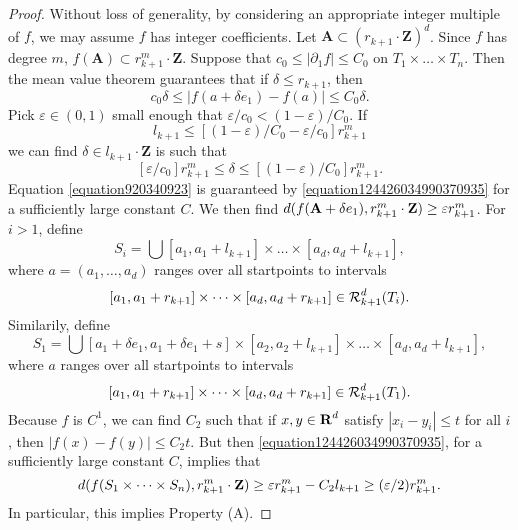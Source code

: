 \begin{proof}
    Without loss of generality, by considering an appropriate integer multiple of $f$, we may assume $f$ has integer coefficients. Let $\mathbf{A} \subset (r_{k+1} \cdot \mathbf{Z})^d$. Since $f$ has degree $m$, $f(\mathbf{A}) \subset r_{k+1}^m \cdot \mathbf{Z}$. Suppose that $c_0 \leq |\partial_1 f| \leq C_0$ on $T_1 \times \dots \times T_n$. Then the mean value theorem guarantees that if $\delta \leq r_{k+1}$, then
    \[ c_0 \delta \leq |f(a + \delta e_1) - f(a)| \leq C_0 \delta. \]
    Pick $\varepsilon \in (0,1)$ small enough that $\varepsilon/c_0 < (1 - \varepsilon)/C_0$. If
    \begin{equation} \label{equation920340923}
        l_{k+1} \leq [(1-\varepsilon)/C_0 - \varepsilon/c_0] r_{k+1}^m
    \end{equation}
    we can find $\delta \in l_{k+1} \cdot \mathbf{Z}$ is such that
    \[ [\varepsilon/c_0] r_{k+1}^m \leq \delta \leq [(1 - \varepsilon)/C_0] r_{k+1}^m. \]
    Equation \eqref{equation920340923} is guaranteed by \eqref{equation124426034990370935} for a sufficiently large constant $C$. We then find $d(f(\mathbf{A} + \delta e_1), r_{k+1}^m \cdot \operatorname{\mathbf{Z}}) \geq \varepsilon r_{k+1}^m$. For $i > 1$, define
    \[ S_i = \bigcup [a_1, a_1 + l_{k+1}] \times \dots \times [a_d, a_d + l_{k+1}], \]
    where $a = (a_1, \dots, a_d)$ ranges over all startpoints to intervals
    \[ [a_1,a_1 + r_{k+1}] \times \dots \times [a_d,a_d + r_{k+1}] \in \operatorname{\mathcal{R}}_{k+1}^d(T_i). \]
    Similarily, define
    \[ S_1 = \bigcup [a_1 + \delta e_1, a_1 + \delta e_1 + s] \times [a_2, a_2 + l_{k+1}] \times \dots \times [a_d, a_d + l_{k+1}], \]
    where $a$ ranges over all startpoints to intervals
    \[ [a_1,a_1 + r_{k+1}] \times \dots \times [a_d,a_d + r_{k+1}] \in \operatorname{\mathcal{R}}_{k+1}^d(T_1). \]
    Because $f$ is $C^1$, we can find $C_2$ such that if $x, y \in \operatorname{\mathbf{R}}^d$ satisfy $|x_i - y_i| \leq t$ for all $i$, then $|f(x) - f(y)| \leq C_2 t$. But then \eqref{equation124426034990370935}, for a sufficiently large constant $C$, implies that
    \[ d(f(S_1 \times \dots \times S_n), r_{k+1}^m \cdot \operatorname{\mathbf{Z}}) \geq \varepsilon r_{k+1}^m - C_2 l_{k+1} \geq (\varepsilon/2) r_{k+1}^m. \]
    In particular, this implies Property (A).
\end{proof}

